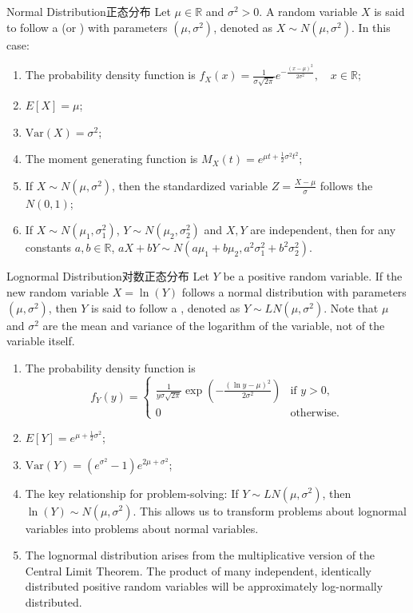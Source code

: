 \documentclass[../main.tex]{subfiles}
\begin{document}
\begin{proposition}{Normal Distribution}{正态分布}
Let $\mu \in \mathbb{R}$ and $\sigma^2 > 0$. A random variable $X$ is said to follow a  (or ) with parameters $(\mu, \sigma^2)$, denoted as $X \sim N(\mu, \sigma^2)$. In this case:
\begin{enumerate}
\item The probability density function is
$f_X(x) = \frac{1}{\sigma\sqrt{2\pi}} e^{-\frac{(x-\mu)^2}{2\sigma^2}}, \quad x \in \mathbb{R};$
\item $E[X] = \mu$;
\item $\text{Var}(X) = \sigma^2$;
\item The moment generating function is
$M_X(t) = e^{\mu t + \frac{1}{2}\sigma^2 t^2};$
\item If $X \sim N(\mu, \sigma^2)$, then the standardized variable $Z = \frac{X-\mu}{\sigma}$ follows the  $N(0,1)$;
\item If $X \sim N(\mu_1, \sigma_1^2)$, $Y \sim N(\mu_2, \sigma_2^2)$ and $X,Y$ are independent, then for any constants $a,b \in \mathbb{R}$,
$aX+bY \sim N(a\mu_1+b\mu_2, a^2\sigma_1^2+b^2\sigma_2^2).$
\end{enumerate}
\end{proposition}
\begin{proposition}{Lognormal Distribution}{对数正态分布}
Let $Y$ be a positive random variable. If the new random variable $X = \ln(Y)$ follows a normal distribution with parameters $(\mu, \sigma^2)$, then $Y$ is said to follow a , denoted as $Y \sim LN(\mu, \sigma^2)$. Note that $\mu$ and $\sigma^2$ are the mean and variance of the logarithm of the variable, not of the variable itself.
\begin{enumerate}
\item The probability density function is
$$f_Y(y) = 
\begin{cases} 
\frac{1}{y\sigma\sqrt{2\pi}} \exp\left(-\frac{(\ln y - \mu)^2}{2\sigma^2}\right) & \text{if } y > 0, \\
0 & \text{otherwise}.
\end{cases}$$
\item $E[Y] = e^{\mu + \frac{1}{2}\sigma^2}$;
\item $\text{Var}(Y) = (e^{\sigma^2}-1)e^{2\mu + \sigma^2}$;
\item The key relationship for problem-solving: If $Y \sim LN(\mu, \sigma^2)$, then $\ln(Y) \sim N(\mu, \sigma^2)$. This allows us to transform problems about lognormal variables into problems about normal variables.
\item The lognormal distribution arises from the multiplicative version of the Central Limit Theorem. The product of many independent, identically distributed positive random variables will be approximately log-normally distributed.
\end{enumerate}
\end{proposition}
\end{document}
